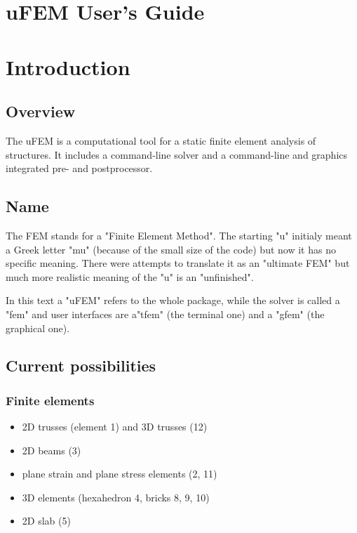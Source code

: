 \documentclass{article}
\begin{document}
\section*{uFEM User's Guide}

\tableofcontents

\section{Introduction}

\subsection{Overview}

 The uFEM is a computational tool for a static finite
 element analysis of structures. It includes a command-line
 solver and a command-line and graphics integrated pre-
 and postprocessor.



\subsection{Name}

 The FEM stands for a "Finite Element Method". The starting
 "u" initialy meant a Greek letter "mu" (because of the small
 size of the code) but now it has no specific meaning.
 There were attempts to translate it as an "ultimate FEM" but 
 much
 more realistic meaning of the "u" is an "unfinished".

 In this text a "uFEM" refers to the whole package, while the solver	
 is called a "fem" and user interfaces are  a"tfem" (the terminal
 one) and a "gfem" (the graphical one).



\subsection{Current possibilities}

\subsubsection{Finite elements}
\begin{itemize}
\item  2D trusses (element 1) and 3D trusses (12)
\item  2D beams (3)
\item  plane strain and plane stress elements (2, 11)
\item  3D elements (hexahedron 4, bricks 8, 9, 10)
\item  2D slab (5)
\end{itemize}
\end{document}
